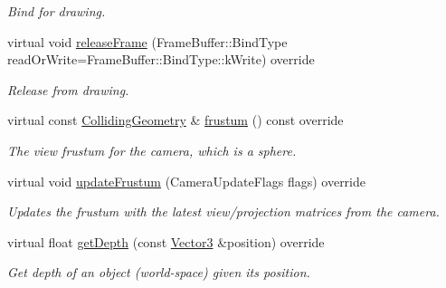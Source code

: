 \begin{Indent}
\begin{DoxyCompactItemize}
\begin{DoxyCompactList}\small\item\em Bind for drawing. \end{DoxyCompactList}\item 
\mbox{\label{classrev_1_1_point_light_camera_a47e9415868cce9ce1b20d1cc7a4c3960}} 
virtual void \mbox{\hyperlink{classrev_1_1_point_light_camera_a47e9415868cce9ce1b20d1cc7a4c3960}{release\+Frame}} (Frame\+Buffer\+::\+Bind\+Type read\+Or\+Write=Frame\+Buffer\+::\+Bind\+Type\+::k\+Write) override
\begin{DoxyCompactList}\small\item\em Release from drawing. \end{DoxyCompactList}\item 
virtual const \mbox{\hyperlink{classrev_1_1_colliding_geometry}{Colliding\+Geometry}} \& \mbox{\hyperlink{classrev_1_1_point_light_camera_a74ce57f46a3a367cc9b41a499b9996e5}{frustum}} () const override
\begin{DoxyCompactList}\small\item\em The view frustum for the camera, which is a sphere. \end{DoxyCompactList}\item 
\mbox{\label{classrev_1_1_point_light_camera_a72eab2d7b17aa96faa4d93a18f4324ac}} 
virtual void \mbox{\hyperlink{classrev_1_1_point_light_camera_a72eab2d7b17aa96faa4d93a18f4324ac}{update\+Frustum}} (Camera\+Update\+Flags flags) override
\begin{DoxyCompactList}\small\item\em Updates the frustum with the latest view/projection matrices from the camera. \end{DoxyCompactList}\item 
virtual float \mbox{\hyperlink{classrev_1_1_point_light_camera_adfa53b5dd87fb570e4d238ccafc7cd5d}{get\+Depth}} (const \mbox{\hyperlink{classrev_1_1_vector}{Vector3}} \&position) override
\begin{DoxyCompactList}\small\item\em Get depth of an object (world-\/space) given its position. \end{DoxyCompactList}\end{DoxyCompactItemize}
\end{Indent}
